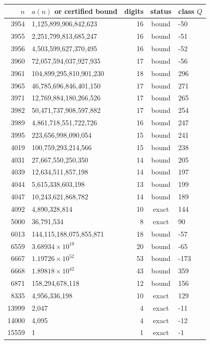 \begin{tabular}{rlrcl}
\toprule
$n$ & $a(n)$ or certified bound & digits & status & class $Q$ \\
\midrule
3954 & 1{,}125{,}899{,}906{,}842{,}623 & 16 & bound & -50 \\
3955 & 2{,}251{,}799{,}813{,}685{,}247 & 16 & bound & -51 \\
3956 & 4{,}503{,}599{,}627{,}370{,}495 & 16 & bound & -52 \\
3960 & 72{,}057{,}594{,}037{,}927{,}935 & 17 & bound & -56 \\
3961 & 104{,}899{,}295{,}810{,}901{,}230 & 18 & bound & 296 \\
3965 & 46{,}785{,}696{,}846{,}401{,}150 & 17 & bound & 271 \\
3971 & 12{,}769{,}884{,}180{,}266{,}526 & 17 & bound & 265 \\
3982 & 50{,}471{,}737{,}908{,}597{,}882 & 17 & bound & 254 \\
3989 & 4{,}861{,}718{,}551{,}722{,}726 & 16 & bound & 247 \\
3995 & 223{,}656{,}998{,}090{,}054 & 15 & bound & 241 \\
4019 & 100{,}759{,}293{,}214{,}566 & 15 & bound & 238 \\
4031 & 27{,}667{,}550{,}250{,}350 & 14 & bound & 205 \\
4039 & 12{,}634{,}511{,}857{,}198 & 14 & bound & 197 \\
4044 & 5{,}615{,}338{,}603{,}198 & 13 & bound & 199 \\
4047 & 10{,}243{,}621{,}868{,}782 & 14 & bound & 189 \\
4092 & 4{,}890{,}328{,}814 & 10 & exact & 144 \\
5000 & 36{,}791{,}534 & 8 & exact & 90 \\
6013 & 144{,}115{,}188{,}075{,}855{,}871 & 18 & bound & -57 \\
6559 & $3.68934\times 10^{19}$ & 20 & bound & -65 \\
6667 & $1.19726\times 10^{52}$ & 53 & bound & -173 \\
6668 & $1.89818\times 10^{42}$ & 43 & bound & 359 \\
6871 & 158{,}294{,}678{,}118 & 12 & bound & 156 \\
8335 & 4{,}956{,}336{,}198 & 10 & exact & 129 \\
13999 & 2{,}047 & 4 & exact & -11 \\
14000 & 4{,}095 & 4 & exact & -12 \\
15559 & 1 & 1 & exact & -1 \\

\end{tabular}
